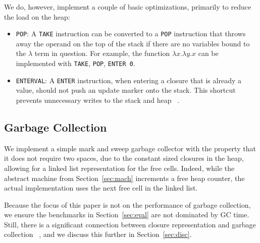 We do, however, implement a couple of basic optimizations, primarily to reduce
the load on the heap:

\begin{itemize}
\item \texttt{POP}: A \texttt{TAKE} instruction can be converted to a \texttt{POP}
instruction that throws away the operand on the top of the stack if there are no
variables bound to the $\lambda$ term in question. For example, the function
$\lambda x.\lambda y.x$ can be implemented with \texttt{TAKE}, \texttt{POP},
\texttt{ENTER 0}.  
\item \texttt{ENTERVAL}: A \texttt{ENTER} instruction, when entering a
closure that is already a value, should not push an update marker onto the
stack. This shortcut prevents unnecessary writes to the stack and heap
~\cite{jonesstg,lkm,sestoft}.  
\end{itemize}

\subsection{Garbage Collection}

We implement a simple mark and sweep garbage collector with the property
that it does not require two spaces, due to the constant sized closures in the
heap, allowing for a linked list representation for the free cells.  Indeed,
while the abstract machine from Section~\ref{sec:mach} increments a free heap
counter, the actual implementation uses the next free cell in the linked list.

Because the focus of this paper is not on the performance of garbage collection,
we ensure the benchmarks in Section~\ref{sec:eval} are not dominated by GC time.
Still, there is a significant connection between closure representation and
garbage collection ~\cite{appel1988optimizing}, and we discuss this further in
Section~\ref{sec:disc}. 

